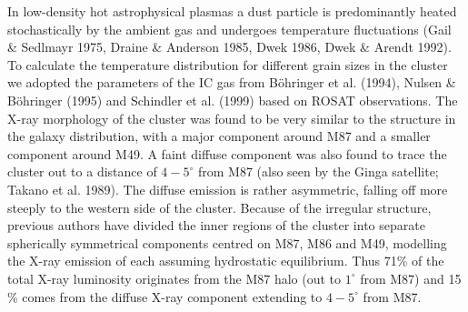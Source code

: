 \documentclass[]{aa}
\begin{document}
In low-density hot astrophysical plasmas a dust particle is predominantly
heated stochastically by the ambient gas and undergoes temperature 
fluctuations (Gail \& Sedlmayr 1975, Draine \& Anderson 1985, Dwek 1986, 
Dwek \& Arendt 1992). To calculate the temperature distribution for different grain 
sizes in the cluster
we adopted the parameters of the IC gas from 
B\"ohringer et al. (1994), Nulsen \& B\"ohringer (1995) and Schindler et al. 
(1999) based on ROSAT 
observations. The X-ray morphology of the cluster was found to be very similar 
to the structure in the galaxy distribution, with a major component around M87 
and a smaller component around M49. A faint diffuse component was 
also found to trace the cluster out to a distance of $4-5^{\circ}$ from M87 
(also seen by the Ginga satellite; Takano et al. 1989). The diffuse emission
is rather asymmetric, falling off more steeply
to the western side of the cluster. Because of the irregular structure,
previous authors have divided the inner regions of the cluster into
separate spherically symmetrical components centred on M87, M86 and M49,
modelling the X-ray emission of each assuming hydrostatic equilibrium.
Thus 71$\%$ of the total X-ray luminosity  
originates from the M87 halo (out to $1^{\circ}$ from M87) and 
15$\%$ comes from the diffuse X-ray component extending to 
$4-5^{\circ}$ from M87.
\end{document}

